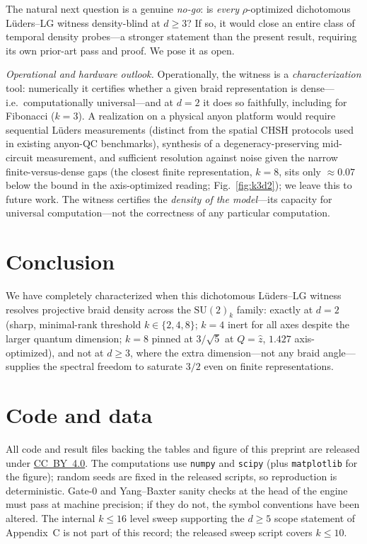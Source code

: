 \documentclass[aps,prx,reprint,amsmath,amssymb,floatfix,nofootinbib,superscriptaddress]{revtex4-2}
\begin{document}
The natural next question is a genuine \emph{no-go}: is \emph{every} $\rho$-optimized
dichotomous L\"uders--LG witness density-blind at $d \ge 3$? If so, it would close an
entire class of temporal density probes---a stronger statement than the present
result, requiring its own prior-art pass and proof. We pose it as open.

\emph{Operational and hardware outlook.} Operationally, the witness is a
\emph{characterization} tool: numerically it certifies whether a given braid
representation is dense---i.e.\ computationally universal---and at $d=2$ it does so
faithfully, including for Fibonacci ($k=3$). A realization on a physical anyon
platform would require sequential L\"uders measurements (distinct from the spatial
CHSH protocols used in existing anyon-QC benchmarks), synthesis of a
degeneracy-preserving mid-circuit measurement, and sufficient resolution against noise
given the narrow finite-versus-dense gaps (the closest finite representation, $k=8$,
sits only $\approx 0.07$ below the bound in the axis-optimized reading;
Fig.~\ref{fig:k3d2}); we leave this to future work. The witness certifies the
\emph{density of the model}---its capacity for universal computation---not the
correctness of any particular computation.

\section{Conclusion}
\label{sec:conc}

We have completely characterized when this dichotomous L\"uders--LG witness resolves
projective braid density across the $\mathrm{SU}(2)_k$ family: exactly at $d=2$ (sharp,
minimal-rank threshold $k \in \{2,4,8\}$; $k=4$ inert for all axes despite the larger quantum
dimension; $k=8$ pinned at $3/\sqrt5$ at $Q=\hat z$, $1.427$ axis-optimized), and not at $d \ge 3$, where the extra
dimension---not any braid angle---supplies the spectral freedom to saturate $3/2$ even
on finite representations.

\section{Code and data}
\label{sec:code}

All code and result files backing the tables and figure of this
preprint are released under
\href{https://creativecommons.org/licenses/by/4.0/}{CC~BY~4.0}. The computations use
\texttt{numpy} and \texttt{scipy} (plus \texttt{matplotlib} for the figure); random seeds are fixed
in the released scripts, so reproduction is deterministic. Gate-$0$ and Yang--Baxter
sanity checks at the head of the engine must pass at machine precision; if they do
not, the symbol conventions have been altered. The internal $k \le 16$ level sweep
supporting the $d \ge 5$ scope statement of Appendix~C is not part of this record;
the released sweep script covers $k \le 10$.
\end{document}
